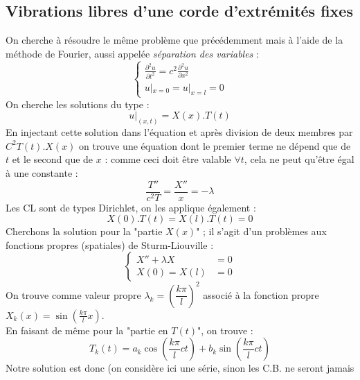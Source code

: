 \documentclass	[11pt, a4paper, openany]{book}
\begin{document}
				\subsection{Vibrations libres d'une corde d'extrémités fixes}
				On cherche à résoudre le même problème que précédemment mais à l'aide de la méthode de 
				Fourier, aussi appelée \textit{séparation des variables} :
				\begin{equation}
					\left\{\begin{array}{l}
					\frac{\partial^2u}{\partial t^2} = c^2\frac{\partial^2u}{\partial x^2}\\
					u|_{x=0} = u|_{x=l} = 0
					\end{array}\right.
				\end{equation}
				On cherche les solutions du type :
				\begin{equation}
					u|_{(x,t)} = X(x).T(t)
				\end{equation}
				En injectant cette solution dans l'équation et après division de deux membres par $C^2
				T(t).X(x)$ on trouve une équation dont le premier terme ne dépend que de $t$ et le 
				second que de $x$ : comme ceci doit être valable $\forall t$, cela ne peut qu'être 
				égal à une constante :
				\begin{equation}
					\dfrac{T''}{c^2T} = \dfrac{X''}{x} = -\lambda
				\end{equation}
				Les CL sont de types Dirichlet, on les applique également :
				\begin{equation}
					X(0).T(t) = X(l).T(t) = 0
				\end{equation}
				Cherchons la solution pour la "partie $X(x)$" ; il s'agit d'un problèmes aux fonctions
				propres (spatiales) de Sturm-Liouville :
				\begin{equation}
					\left\{\begin{array}{ll}
					X'' + \lambda X &=0\\
					X(0) = X(l) &=0
					\end{array}\right.
				\end{equation}
				On trouve comme valeur propre $\lambda_k = \left(\dfrac{k\pi}{l}\right)^2$ associé à 
				la fonction propre $X_k(x) = \sin\left(\frac{k\pi}{l}x\right)$.\\
				En faisant de même pour la "partie en $T(t)$", on trouve :
				\begin{equation}
					T_k(t) = a_k\cos\left(\frac{k\pi}{l}ct\right)+b_k\sin\left(\frac{k\pi}{l}ct\right)
				\end{equation}
				Notre solution est donc (on considère ici une série, sinon les C.B. ne seront jamais
\end{document}
